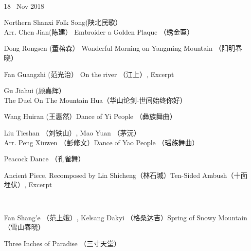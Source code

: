 \documentclass[letter,6pt,poets]{ConcProg}
\begin{document}
\begin{spacing}{1.0}
\begin{programme}{
\\  {\normalsize 18 ~Nov 2018}
}
\begin{part}[]
    \begin{composition}{Northern Shanxi Folk Song(陕北民歌）\\Arr. Chen Jian(陈建）} {}{Embroider a Golden Plaque  （绣金匾）}{}
    \end{composition}
    \begin{composition}{Dong Rongsen (董榕森）} {}{Wonderful Morning on Yangming Mountain  （阳明春晓）
}{}
    \end{composition}
    \begin{composition}{Fan Guangzhi (范光治）} {}{On the river （江上）, Excerpt}{}
                   {}{}
    \end{composition}
     \begin{composition}{Gu Jiahui (顾嘉辉）} {}{The Duel On The Mountain Hua（华山论剑-世间始终你好）}{}
                   {}{}
    \end{composition}    
    \begin{composition}{Wang Huiran (王惠然）}{}{Dance of Yi People  （彝族舞曲）}{}
                   {}{}
    \end{composition}
    \begin{composition}{Liu Tieshan （刘铁山）, Mao Yuan （茅沅） \\Arr. Peng Xiuwen （彭修文）}{}{Dance of Yao People  （瑶族舞曲）}{}
    \end{composition}
    \begin{composition}{}{}{Peacock Dance （孔雀舞） }{}
                   {}{}
    \end{composition}
    \begin{composition}{Ancient Piece, Recomposed by Lin Shicheng（林石城）}{}{Ten-Sided Ambush（十面埋伏）, Excerpt}{}
    \end{composition}\\
    \begin{composition}{Fan Shang'e （范上娥）, Kelsang Dakyi （格桑达吉）}{}{Spring of Snowy Mountain   （雪山春晓）}{}
                   {}{}
    \end{composition}
    \begin{composition}{}{}{Three Inches of Paradise  （三寸天堂）}{}

\end{composition}
\end{part}
\end{programme}
\end{spacing}
\end{document}

